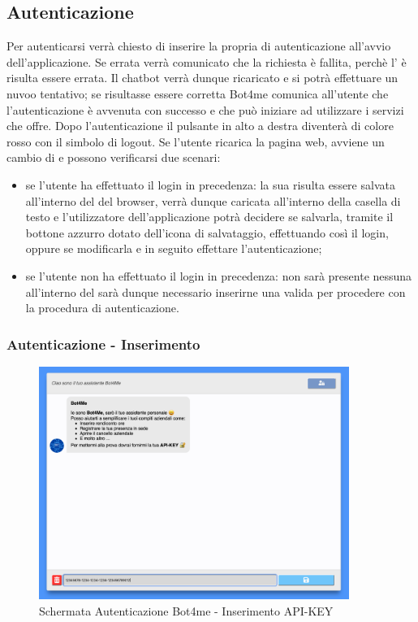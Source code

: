 \subsection{Autenticazione}
Per autenticarsi verrà chiesto di inserire la propria  di autenticazione all'avvio dell'applicazione. Se errata verrà comunicato che la richiesta è fallita, perchè l' è risulta essere errata. Il chatbot verrà dunque ricaricato e si potrà effettuare un nuvoo tentativo; se risultasse essere corretta Bot4me comunica all'utente che l'autenticazione è avvenuta con successo e che può iniziare ad utilizzare i servizi che offre. 
Dopo l'autenticazione il pulsante in alto a destra diventerà di colore rosso con il simbolo di logout.
Se l'utente ricarica la pagina web, avviene un cambio di  e possono verificarsi due scenari: 
\begin{itemize}
    \item se l'utente ha effettuato il login in precedenza: la sua  risulta essere salvata all'interno del  del browser, verrà dunque caricata all'interno della casella di testo e l'utilizzatore dell'applicazione potrà decidere se salvarla, tramite il bottone azzurro dotato dell'icona di salvataggio, effettuando così il login, oppure se modificarla e in seguito effettare l'autenticazione; 
    \item se l'utente non ha effettuato il login in precedenza: non sarà presente nessuna  all'interno del  sarà dunque necessario inserirne una valida per procedere con la procedura di autenticazione. 
\end{itemize}

\subsubsection{Autenticazione - Inserimento }
\begin{figure}[H]
    \centering\includegraphics[width=0.9\textwidth, height=0.7\textheight, keepaspectratio]{images/schermata_autenticazione.png}
    \caption{Schermata Autenticazione Bot4me - Inserimento API-KEY}
\end{figure}

